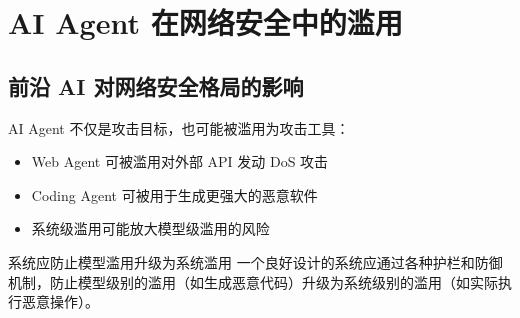 \section{AI Agent 在网络安全中的滥用}

\subsection{前沿 AI 对网络安全格局的影响}

AI Agent 不仅是攻击目标，也可能被滥用为攻击工具：
\begin{itemize}
    \item Web Agent 可被滥用对外部 API 发动 DoS 攻击
    \item Coding Agent 可被用于生成更强大的恶意软件
    \item 系统级滥用可能放大模型级滥用的风险
\end{itemize}

\begin{warningbox}{系统应防止模型滥用升级为系统滥用}
一个良好设计的系统应通过各种护栏和防御机制，防止模型级别的滥用（如生成恶意代码）升级为系统级别的滥用（如实际执行恶意操作）。
\end{warningbox}

